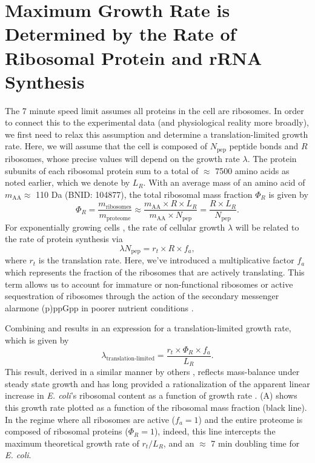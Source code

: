 \section{Maximum Growth Rate is Determined by the Rate of Ribosomal Protein and rRNA Synthesis}
\label{sec:limit}
The 7 minute speed limit assumes all
proteins in the cell are ribosomes. In order to connect this to the
experimental data (and physiological reality more broadly), we first need to relax this assumption and determine a
translation-limited growth rate. Here, we will assume that the cell is composed
of $N_\text{pep}$ peptide bonds and $R$ ribosomes, whose precise values will depend on the
growth rate $\lambda$. The protein subunits of each ribosomal protein sum to a
total of $\approx$ 7500 amino acids as noted earlier, which we denote by $L_R$.
With an average mass of an amino acid of $m_\text{AA} \approx$ 110
Da (BNID: 104877), the total ribosomal mass fraction  $\Phi_R$ is given by
\begin{equation}
  \Phi_R = \frac{m_\text{ribosomes} }{m_\text{proteome}} \approx \frac{m_\text{AA} \times R \times L_R}{m_\text{AA} \times N_\text{pep}} = \frac{R \times L_R}{N_\text{pep}}.
  \label{eq:phir}
\end{equation}
For exponentially growing cells \citep{godin2010}, the rate of cellular growth $\lambda$ will
be related to the rate of protein synthesis via
\begin{equation}
  \lambda N_\text{pep} = r_t \times R \times f_a,
  \label{eq:lam_npep}
\end{equation}
where $r_t$ is the translation rate. Here, we've introduced a multiplicative
factor $f_a$ which represents the fraction of the ribosomes that are actively
translating. This term allows us to account for immature or non-functional
ribosomes or active sequestration of ribosomes through the action of the
secondary messenger alarmone (p)ppGpp in poorer nutrient conditions
\citep{hauryliuk2015}.

Combining  and  results in an expression for a
translation-limited growth rate, which is given by
\begin{equation}
\lambda_\text{translation-limited} = \frac{r_t\times \Phi_R\times f_a}{L_R}.
\label{eq:lam_limited}
\end{equation}
This result, derived in a similar manner by others \citep{dennis2004,
klumpp2013}, reflects mass-balance under steady state growth and has long
provided a rationalization of the apparent linear increase in \textit{E. coli}'s
ribosomal content as a function of growth rate \citep{goldberger1979,
dennis2004, scott2010, dai2016}. (A) shows this growth rate
plotted as a function of the ribosomal mass fraction (black line). In the regime
where all ribosomes are active ($f_a = 1$) and the entire proteome is composed
of ribosomal proteins ($\Phi_R = 1$), indeed, this line intercepts the maximum
theoretical growth rate of $r_t / L_R$, and an $\approx$ 7 min doubling time for
\textit{E. coli}.

